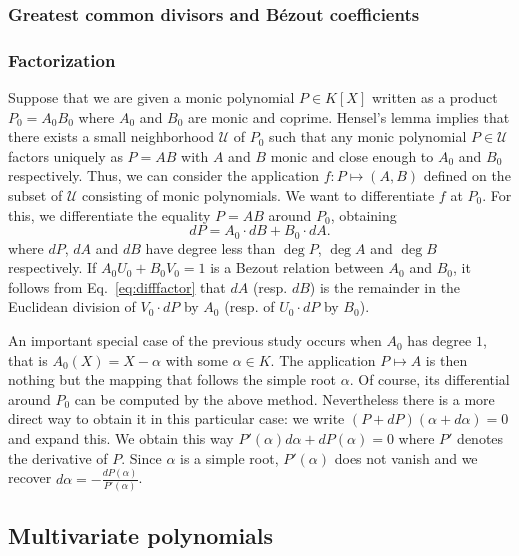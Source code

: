 \documentclass{lms}
\begin{document}
\subsubsection*{Greatest common divisors and B\'ezout coefficients}


\subsubsection*{Factorization}

Suppose that we are given a monic polynomial $P \in K[X]$ written as a 
product $P_0 = A_0 B_0$ where $A_0$ and $B_0$ are monic and coprime. 
Hensel's lemma implies that there exists a small neighborhood $\mathcal 
U$ of $P_0$ such that any monic polynomial $P \in \mathcal U$ factors 
uniquely as $P = A B$ with $A$ and $B$ monic and close enough to $A_0$ 
and $B_0$ respectively. Thus, we can consider the application $f : P 
\mapsto (A,B)$ defined on the subset of $\mathcal U$ consisting of monic 
polynomials. We want to differentiate $f$ at $P_0$. For this, we 
differentiate the equality $P = A B$ around $P_0$, obtaining
\begin{equation}
\label{eq:difffactor}
dP = A_0 \cdot dB + B_0 \cdot dA.
\end{equation}
where $dP$, $dA$ and $dB$ have degree less than $\deg P$, $\deg A$ and 
$\deg B$ respectively. If $A_0 U_0 + B_0 V_0 = 1$ is a Bezout relation
between $A_0$ and $B_0$, it follows from Eq.~\eqref{eq:difffactor} that
$dA$ (resp. $dB$) is the remainder in the Euclidean division of $V_0
{\cdot} dP$ by $A_0$ (resp. of $U_0 {\cdot} dP$ by $B_0$).

An important special case of the previous study occurs when $A_0$ has 
degree $1$, that is $A_0(X) = X - \alpha$ with some $\alpha \in K$. The 
application $P \mapsto A$ is then nothing but the mapping that follows 
the simple root $\alpha$. Of course, its differential around $P_0$ can 
be computed by the above method. Nevertheless there is a more direct way 
to obtain it in this particular case: we write $(P + dP)(\alpha + 
d\alpha) = 0$ and expand this. We obtain this way $P'(\alpha) d\alpha + 
dP(\alpha) = 0$ where $P'$ denotes the derivative of $P$. Since $\alpha$ 
is a simple root, $P'(\alpha)$ does not vanish and we recover $d \alpha 
= - \frac{dP(\alpha)}{P'(\alpha)}$.

\subsection{Multivariate polynomials}
\end{document}
